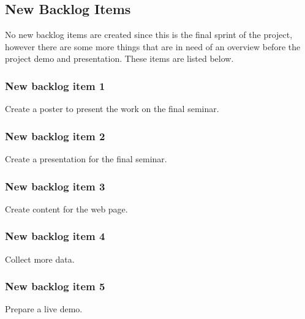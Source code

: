 \subsection{New Backlog Items}
No new backlog items are created since this is the final sprint of the project, however there are some more things that are in need of an overview before the project demo and presentation. These items are listed below.

\subsubsection{New backlog item 1}
Create a poster to present the work on the final seminar.

\subsubsection{New backlog item 2}
Create a presentation for the final seminar.

\subsubsection{New backlog item 3}
Create content for the web page.

\subsubsection{New backlog item 4}
Collect more data.

\subsubsection{New backlog item 5}
Prepare a live demo.


